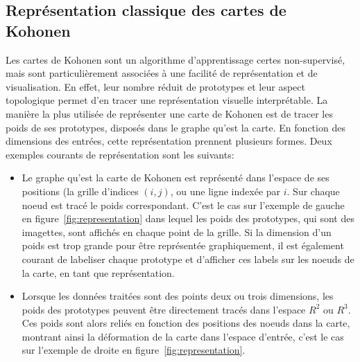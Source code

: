 \subsection{Représentation classique des cartes de Kohonen}

Les cartes de Kohonen sont un algorithme d'apprentissage certes non-supervisé, mais sont particulièrement associées à une facilité de représentation et de visualisation. En effet, leur nombre réduit de prototypes et leur aspect topologique permet d'en tracer une représentation visuelle interprétable.
La manière la plus utilisée de représenter une carte de Kohonen est de tracer les poids de ses prototypes, disposés dans le graphe qu'est la carte. En fonction des dimensions des entrées, cette représentation prennent plusieurs formes. Deux exemples courants de représentation sont les suivants: 
\begin{itemize}
\item Le graphe qu'est la carte de Kohonen est représenté dans l'espace de ses positions (la grille d'indices $(i,j)$, ou une ligne indexée par $i$. Sur chaque noeud est tracé le poids correspondant. C'est le cas sur l'exemple de gauche en figure~\ref{fig:representation} dans lequel les poids des prototypes, qui sont des imagettes, sont affichés en chaque point de la grille. Si la dimension d'un poids est trop grande pour être représentée graphiquement, il est également courant de labeliser chaque prototype et d'afficher ces labels sur les noeuds de la carte, en tant que représentation.
\item Lorsque les données traitées sont des points deux ou trois dimensions, les poids des prototypes peuvent être directement tracés dans l'espace $R^2$ ou $R^3$. Ces poids sont alors reliés en fonction des positions des noeuds dans la carte, montrant ainsi la déformation de la carte dans l'espace d'entrée, c'est le cas sur l'exemple de droite en figure~\ref{fig:representation}.
\end{itemize}

